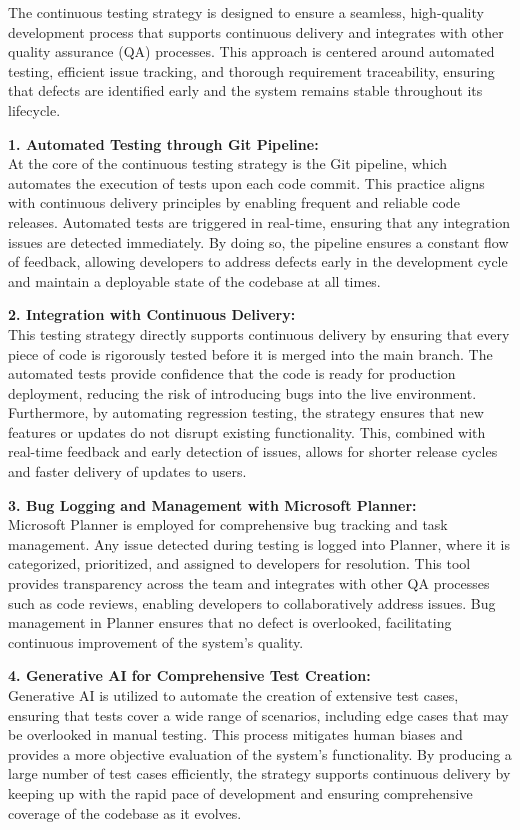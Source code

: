 \documentclass{article}
\begin{document}
The continuous testing strategy is designed to ensure a seamless, high-quality development process that supports continuous delivery and integrates with other quality assurance (QA) processes. This approach is centered around automated testing, efficient issue tracking, and thorough requirement traceability, ensuring that defects are identified early and the system remains stable throughout its lifecycle.

\textbf{1. Automated Testing through Git Pipeline:}\\
At the core of the continuous testing strategy is the Git pipeline, which automates the execution of tests upon each code commit. This practice aligns with continuous delivery principles by enabling frequent and reliable code releases. Automated tests are triggered in real-time, ensuring that any integration issues are detected immediately. By doing so, the pipeline ensures a constant flow of feedback, allowing developers to address defects early in the development cycle and maintain a deployable state of the codebase at all times.

\textbf{2. Integration with Continuous Delivery:}\\
This testing strategy directly supports continuous delivery by ensuring that every piece of code is rigorously tested before it is merged into the main branch. The automated tests provide confidence that the code is ready for production deployment, reducing the risk of introducing bugs into the live environment. Furthermore, by automating regression testing, the strategy ensures that new features or updates do not disrupt existing functionality. This, combined with real-time feedback and early detection of issues, allows for shorter release cycles and faster delivery of updates to users.

\textbf{3. Bug Logging and Management with Microsoft Planner:}\\
Microsoft Planner is employed for comprehensive bug tracking and task management. Any issue detected during testing is logged into Planner, where it is categorized, prioritized, and assigned to developers for resolution. This tool provides transparency across the team and integrates with other QA processes such as code reviews, enabling developers to collaboratively address issues. Bug management in Planner ensures that no defect is overlooked, facilitating continuous improvement of the system's quality.

\textbf{4. Generative AI for Comprehensive Test Creation:}\\
Generative AI is utilized to automate the creation of extensive test cases, ensuring that tests cover a wide range of scenarios, including edge cases that may be overlooked in manual testing. This process mitigates human biases and provides a more objective evaluation of the system’s functionality. By producing a large number of test cases efficiently, the strategy supports continuous delivery by keeping up with the rapid pace of development and ensuring comprehensive coverage of the codebase as it evolves.
\end{document}
